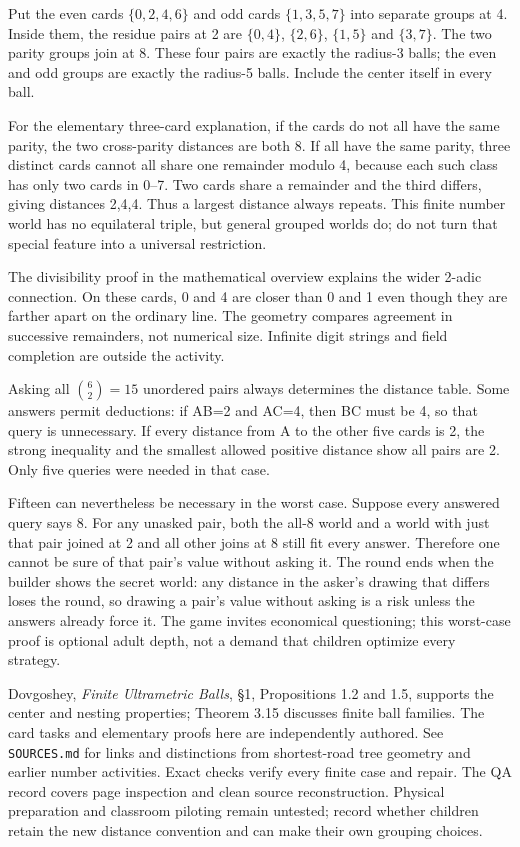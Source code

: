 Put the even cards $\{0,2,4,6\}$ and odd cards $\{1,3,5,7\}$ into separate groups at 4. Inside them, the residue pairs at 2 are $\{0,4\}$, $\{2,6\}$, $\{1,5\}$ and $\{3,7\}$. The two parity groups join at 8. These four pairs are exactly the radius-3 balls; the even and odd groups are exactly the radius-5 balls. Include the center itself in every ball.

For the elementary three-card explanation, if the cards do not all have the same parity, the two cross-parity distances are both 8. If all have the same parity, three distinct cards cannot all share one remainder modulo 4, because each such class has only two cards in 0--7. Two cards share a remainder and the third differs, giving distances 2,4,4. Thus a largest distance always repeats. This finite number world has no equilateral triple, but general grouped worlds do; do not turn that special feature into a universal restriction.

The divisibility proof in the mathematical overview explains the wider 2-adic connection. On these cards, 0 and 4 are closer than 0 and 1 even though they are farther apart on the ordinary line. The geometry compares agreement in successive remainders, not numerical size. Infinite digit strings and field completion are outside the activity.

Asking all $\binom62=15$ unordered pairs always determines the distance table. Some answers permit deductions: if AB=2 and AC=4, then BC must be 4, so that query is unnecessary. If every distance from A to the other five cards is 2, the strong inequality and the smallest allowed positive distance show all pairs are 2. Only five queries were needed in that case.

Fifteen can nevertheless be necessary in the worst case. Suppose every answered query says 8. For any unasked pair, both the all-8 world and a world with just that pair joined at 2 and all other joins at 8 still fit every answer. Therefore one cannot be sure of that pair's value without asking it. The round ends when the builder shows the secret world: any distance in the asker's drawing that differs loses the round, so drawing a pair's value without asking is a risk unless the answers already force it. The game invites economical questioning; this worst-case proof is optional adult depth, not a demand that children optimize every strategy.

Dovgoshey, \emph{Finite Ultrametric Balls}, \S1, Propositions 1.2 and 1.5, supports the center and nesting properties; Theorem 3.15 discusses finite ball families. The card tasks and elementary proofs here are independently authored. See \texttt{SOURCES.md} for links and distinctions from shortest-road tree geometry and earlier number activities. Exact checks verify every finite case and repair. The QA record covers page inspection and clean source reconstruction. Physical preparation and classroom piloting remain untested; record whether children retain the new distance convention and can make their own grouping choices.
